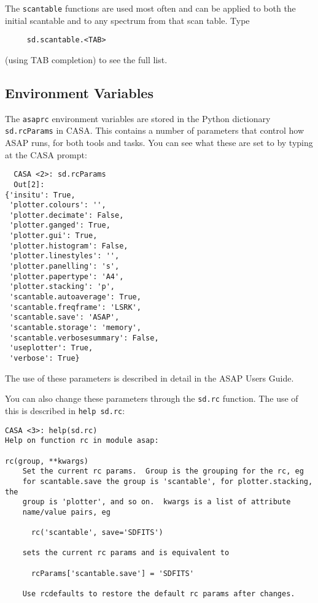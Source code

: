 The {\tt scantable} functions are used most often and can be applied
to both the initial scantable and to any spectrum from that scan
table.  Type
\small
\begin{verbatim}
     sd.scantable.<TAB>
\end{verbatim}
\normalsize
(using TAB completion) to see the full list. 

\subsection{Environment Variables}
\label{subsection:sd.asap.environ}

The {\tt asaprc} environment variables are stored in the Python
dictionary {\tt sd.rcParams} in CASA.  This contains a number
of parameters that control how ASAP runs, for both tools and
tasks.  You can see what these are set to by typing at the
CASA prompt:

\small
\begin{verbatim}
  CASA <2>: sd.rcParams
  Out[2]: 
{'insitu': True,
 'plotter.colours': '',
 'plotter.decimate': False,
 'plotter.ganged': True,
 'plotter.gui': True,
 'plotter.histogram': False,
 'plotter.linestyles': '',
 'plotter.panelling': 's',
 'plotter.papertype': 'A4',
 'plotter.stacking': 'p',
 'scantable.autoaverage': True,
 'scantable.freqframe': 'LSRK',
 'scantable.save': 'ASAP',
 'scantable.storage': 'memory',
 'scantable.verbosesummary': False,
 'useplotter': True,
 'verbose': True}
\end{verbatim}
\normalsize

The use of these parameters is described in detail in the
ASAP Users Guide.

You can also change these parameters through the {\tt sd.rc}
function.  The use of this is described in {\tt help sd.rc}:

\small
\begin{verbatim}
CASA <3>: help(sd.rc)
Help on function rc in module asap:

rc(group, **kwargs)
    Set the current rc params.  Group is the grouping for the rc, eg
    for scantable.save the group is 'scantable', for plotter.stacking, the
    group is 'plotter', and so on.  kwargs is a list of attribute
    name/value pairs, eg
    
      rc('scantable', save='SDFITS')
    
    sets the current rc params and is equivalent to
    
      rcParams['scantable.save'] = 'SDFITS'
    
    Use rcdefaults to restore the default rc params after changes.
\end{verbatim}
\normalsize

